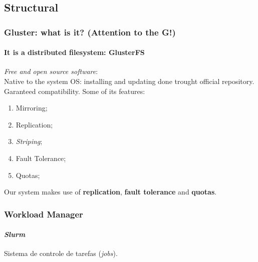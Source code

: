 \documentclass[svgnames,smaller,table]{beamer}
\begin{document}
\subsection{Structural}
\begin{frame}
  \frametitle{Gluster: what is it? (Attention to the G!)}
  \framesubtitle{It is a distributed filesystem: \textbf{GlusterFS}}

\textbullet  \textit{Free and open source software}:\\%
\textbullet  Native to the system OS: installing and updating done trought official repository. Garanteed compatibility.
  \vspace{10px}
  Some of its features:
  \begin{enumerate}
  \item Mirroring;
  \item Replication;
  \item \textit{Striping};
  \item Fault Tolerance;
  \item Quotas;
  \end{enumerate}
  \vspace{10px}
  Our system makes use of \textbf{replication}, \textbf{fault tolerance} and \textbf{quotas}.
\end{frame}


%


\begin{frame}
  \frametitle{Workload Manager}
  \framesubtitle{\textit{Slurm}}

  \textbullet Sistema de controle de tarefas (\textit{jobs}).\\
\end{frame}
\end{document}
